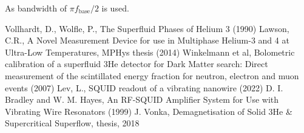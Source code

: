 \documentclass[a4paper,12pt]{article}
\begin{document}
As bandwidth of $\pi f_\mathrm{base}/2$ is used.


\pagebreak
\newpage

\begin{thebibliography}{9}

 Vollhardt, D., Wolfle, P., The Superfluid Phases of Helium 3 (1990)
 Lawson, C.R., A Novel Measurement Device for use in Multiphase Helium-3 and 4 at Ultra-Low Temperatures, MPHys thesis (2014)
 Winkelmann et al, Bolometric calibration of a superfluid 3He detector for Dark Matter search: Direct measurement of the scintillated energy fraction for
neutron, electron and muon events (2007)
 Lev, L., SQUID readout of a vibrating nanowire (2022)
 D. I. Bradley and W. M. Hayes, An RF-SQUID Amplifier System for Use with Vibrating Wire Resonators (1999)
 J. Vonka, Demagnetisation of Solid 3He \& Supercritical Superflow, thesis, 2018
\end{thebibliography}
\end{document}
